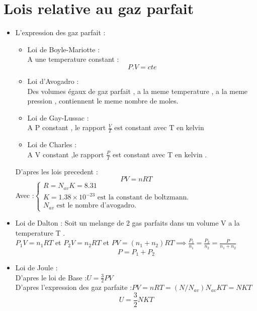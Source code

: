 \documentclass[12pt,oneside]{book}
\begin{document}
\section{Lois relative au gaz parfait}
\begin{itemize}
    \item L'expression des gaz parfait :
          \begin{itemize}
              \item Loi de Boyle-Mariotte :\\
                    A une  temperature constant :
                    \[P.V = cte\]
              \item Loi d'Avogadro : \\
                    Des volumes égaux de gaz parfait , a la meme temperature , a la meme pression , contiennent le meme nombre de moles.
              \item Loi de Gay-Lussac : \\
                    A P constant , le rapport $\frac{V}{T}$ est constant avec T en kelvin
              \item Loi de Charles :\\
                    A V constant ,le rapport $\frac{P}{T}$ est constant avec T en kelvin .
          \end{itemize}
          D'apres les lois precedent :
          \[\boxed{PV = nRT}\]
          Avec :$\begin{cases}
                  R= N_{av}K = 8.31                                             \\
                  K = 1.38\times 10^{-23} \text{ est la constant de boltzmann.} \\
                  N_{av} \text{ est le nombre d'avogadro.}
              \end{cases}$

    \item Loi de Dalton :  Soit un melange de 2 gas parfaits dans un volume V a la temperature T . \\
          $P_1V = n_1RT$ et $P_2V =n_2RT $ et $PV = (n_1 + n_2)RT \implies \frac{P_1}{n_1} = \frac{P_2}{n_2} = \frac{P}{n_1 + n_2}$
          \[ \boxed{ P = P_1 + P_2} \]
    \item Loi de Joule :\\
          D'apres le loi de Base :$U = \frac{3}{2}PV$\\
          D'apres l'expression des gaz parfaite :$PV =nRT=(N/N_{av})N_{av}KT = NKT$
          \[\boxed{U = \frac{3}{2}NKT}\]
\end{itemize}
\end{document}
